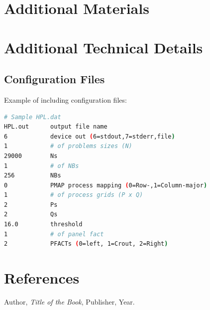 \documentclass[a4paper,12pt]{article}
\begin{document}
\newpage

\section{Additional Materials}

\newpage

\appendix
\section{Additional Technical Details}
\subsection{Configuration Files}
Example of including configuration files:

\begin{lstlisting}[language=bash, caption=HPL Configuration File]
# Sample HPL.dat
HPL.out      output file name
6            device out (6=stdout,7=stderr,file)
1            # of problems sizes (N)
29000        Ns
1            # of NBs
256          NBs
0            PMAP process mapping (0=Row-,1=Column-major)
1            # of process grids (P x Q)
2            Ps
2            Qs
16.0         threshold
1            # of panel fact
2            PFACTs (0=left, 1=Crout, 2=Right)
\end{lstlisting}

\newpage

\section{References}
\begin{thebibliography}{9}
Author, \textit{Title of the Book}, Publisher, Year.
\end{thebibliography}

\newpage
\end{document}
